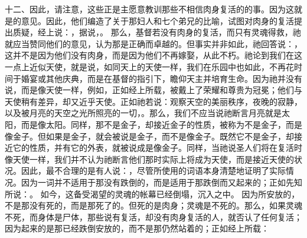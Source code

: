 十二、因此，请注意，这些正是主愿意教训那些不相信肉身复活的的事。因为这就是的意见。因此，他们编造了关于那妇人和七个弟兄的比喻，试图对肉身的复活提出质疑，经上说：，据说，。\newline{} 那么，基督若没有肉身的复活，而只有灵魂得救，祂就应当赞同他们的意见，认为那是正确而卓越的。但事实并非如此，祂回答说：，这并不是因为他们没有肉身，而是因为他们不再嫁娶，从此不朽。祂论到我们在这一点上近似天使，就是说，如同天上的天使一样，我们在乐园中也如此，不再花时间于婚宴或其他庆典，而是在基督的指引下，瞻仰天主并培育生命。因为祂并没有说，而是像天使一样，例如，正如经上所载，被戴上了荣耀和尊贵为冠冕；他们与天使稍有差异，却又近乎天使。正如祂若说：观察天空的美丽秩序，夜晚的寂静，以及被月亮的天空之光所照亮的一切，。那么，我们不应当说祂断言月亮就是太阳，而是像太阳。同样，那不是金子，却接近金子的性质，被称为不是金子，而是像金子。但如果是金子，就会被说是金子，而不是像金子。既然它不是金子，却接近它的性质，并有它的外表，就被说成是像金子。同样，当祂说圣人们将在复活时像天使一样，我们并不认为祂断言他们那时实际上将成为天使，而是接近天使的状况。因此，最不合理的是有人说：，尽管所使用的词语本身清楚地证明了实际情况。因为一词并不适用于那没有跌倒的，而是适用于那跌倒而又起来的；正如先知所说：。 如今，这备受渴望的灵魂的帐幕已经倒塌，沉入之中。 因为所安放的，不是那没有死的，而是那死了的。但死的是肉身；灵魂是不死的。那么，如果灵魂不死，而身体是尸体，那些说有复活，却没有肉身复活的人，就否认了任何复活；因为起来的是那已经跌倒安放的，而不是那仍然站着的；正如经上所载：\par

